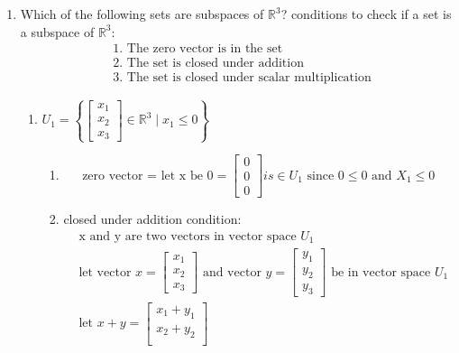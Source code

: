 \documentclass[11pt]{article}
\begin{document}
\begin{enumerate}
\item Which of the following sets are subspaces of \( \mathbb{R}^3 \)?\newline
conditions to check if a set is a subspace of \( \mathbb{R}^3 \):
\[
    \begin{aligned}
        &\text{1. The zero vector is in the set} \\
        &\text{2. The set is closed under addition} \\
        &\text{3. The set is closed under scalar multiplication}
    \end{aligned}
\]
\begin{enumerate}
    \item \( U_1 = \left\{ \begin{bmatrix}
        x_1 \\
        x_2 \\
        x_3
        \end{bmatrix} \in \mathbb{R}^3 \mid x_1 \leq 0 \right\} \)
    \begin{enumerate}
        \item 
        \[    
        \text{zero vector = let x be 0} =
        \begin{bmatrix}
        0 \\
        0 \\
        0
        \end{bmatrix}  is \in U_1 \text{ since } 0 \leq 0 \text{ and } X_1 \leq 0
        \]
        \item closed under addition condition:
        \[
        \begin{aligned}
            &\text{x and y are two vectors in  vector space } U_1 \\
            &\text{let vector } x = \begin{bmatrix}
                x_1 \\
                x_2 \\
                x_3
            \end{bmatrix} \text{ and vector } y = \begin{bmatrix}
                y_1 \\
                y_2 \\
                y_3
            \end{bmatrix} \text{ be in vector space } U_1 \\
            &\text{let } x + y = \begin{bmatrix}
                x_1 + y_1 \\
                x_2 + y_2 \\

\end{bmatrix}
\end{aligned}\]
\end{enumerate}
\end{enumerate}
\end{enumerate}
\end{document}
